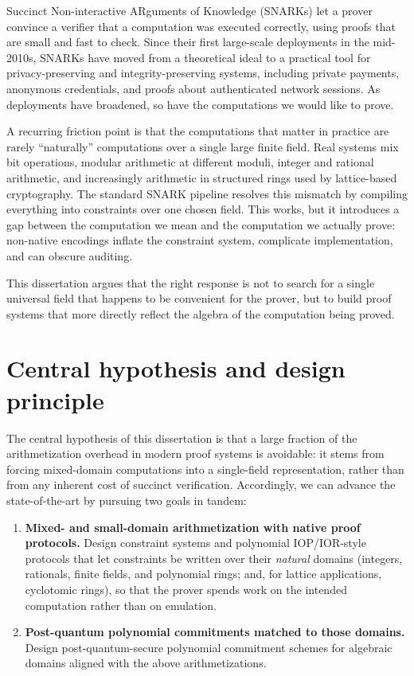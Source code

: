 Succinct Non-interactive ARguments of Knowledge (SNARKs) let a prover convince a verifier that a computation was executed correctly, using proofs that are small and fast to check. Since their first large-scale deployments in the mid-2010s, SNARKs have moved from a theoretical ideal to a practical tool for privacy-preserving and integrity-preserving systems, including private payments, anonymous credentials, and proofs about authenticated network sessions. As deployments have broadened, so have the computations we would like to prove.

A recurring friction point is that the computations that matter in practice are rarely ``naturally'' computations over a single large finite field. Real systems mix bit operations, modular arithmetic at different moduli, integer and rational arithmetic, and increasingly arithmetic in structured rings used by lattice-based cryptography. The standard SNARK pipeline resolves this mismatch by compiling everything into constraints over one chosen field. This works, but it introduces a gap between the computation we mean and the computation we actually prove: non-native encodings inflate the constraint system, complicate implementation, and can obscure auditing.

This dissertation argues that the right response is not to search for a single universal field that happens to be convenient for the prover, but to build proof systems that more directly reflect the algebra of the computation being proved.

\section{Central hypothesis and design principle}

The central hypothesis of this dissertation is that a large fraction of the arithmetization overhead in modern proof systems is avoidable: it stems from forcing mixed-domain computations into a single-field representation, rather than from any inherent cost of succinct verification. Accordingly, we can advance the state-of-the-art by pursuing two goals in tandem:

\begin{enumerate}
  \item \textbf{Mixed- and small-domain arithmetization with native proof protocols.}
  Design constraint systems and polynomial IOP/IOR-style protocols that let constraints be written over their \emph{natural} domains (integers, rationals, finite fields, and polynomial rings; and, for lattice applications, cyclotomic rings), so that the prover spends work on the intended computation rather than on emulation.

  \item \textbf{Post-quantum polynomial commitments matched to those domains.}
  Design post-quantum-secure polynomial commitment schemes for algebraic domains aligned with the above arithmetizations.
\end{enumerate}

